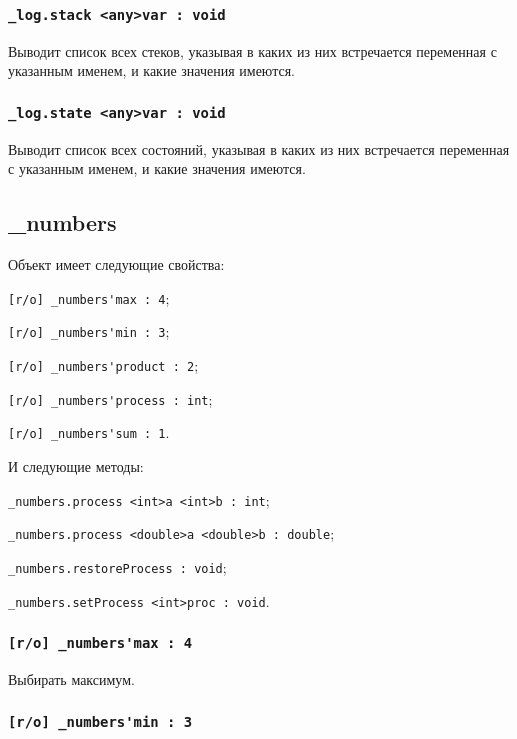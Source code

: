 \subsubsection{\lstinline|_log.stack <any>var : void|}

Выводит список всех стеков, указывая в каких из них встречается переменная с указанным именем, и какие значения имеются.

\subsubsection{\lstinline|_log.state <any>var : void|}

Выводит список всех состояний, указывая в каких из них встречается переменная с указанным именем, и какие значения имеются.

\subsection{{\color{orange} \_numbers}}

Объект \numbers{} имеет следующие свойства:
\begin{icItems}
	\item \lstinline|[r/o] _numbers'max : 4|;
	\item \lstinline|[r/o] _numbers'min : 3|;
	\item \lstinline|[r/o] _numbers'product : 2|;
	\item \lstinline|[r/o] _numbers'process : int|;
	\item \lstinline|[r/o] _numbers'sum : 1|.
\end{icItems}

И следующие методы:
\begin{icItems}
	\item \lstinline|_numbers.process <int>a <int>b : int|;
	\item \lstinline|_numbers.process <double>a <double>b : double|;
	\item \lstinline|_numbers.restoreProcess : void|;
	\item \lstinline|_numbers.setProcess <int>proc : void|.
\end{icItems}

\subsubsection{\lstinline|[r/o] _numbers'max : 4|}

Выбирать максимум.

\subsubsection{\lstinline|[r/o] _numbers'min : 3|}

